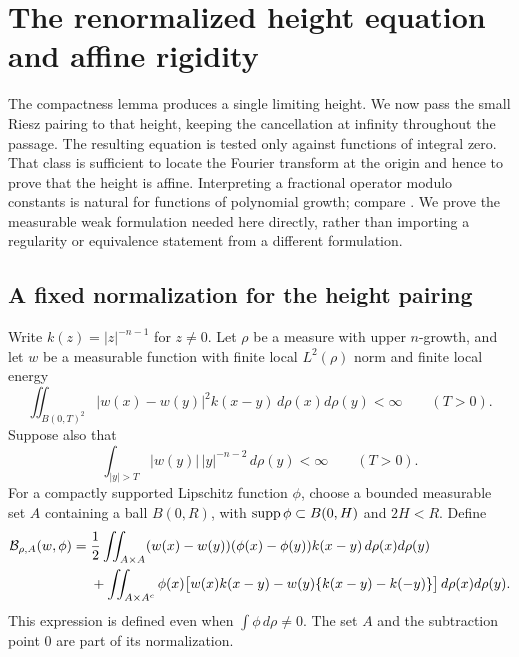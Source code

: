 \section[The height equation and affine rigidity]{The renormalized height equation and affine rigidity}
\label{sec:fractional-rigidity}

The compactness lemma produces a single limiting height.  We now pass the
small Riesz pairing to that height, keeping the cancellation at infinity
throughout the passage.  The resulting equation is tested only against
functions of integral zero.  That class is sufficient to locate the Fourier
transform at the origin and hence to prove that the height is affine.
Interpreting a fractional operator modulo constants is natural for
functions of polynomial growth; compare
\cite{DipierroSavinValdinoci2019}. We prove the measurable weak
formulation needed here directly, rather than importing a regularity
or equivalence statement from a different formulation.

\subsection{A fixed normalization for the height pairing}

Write $k(z)=|z|^{-n-1}$ for $z\ne0$.  Let $\rho$ be a measure with upper
$n$-growth, and let $w$ be a measurable function with finite local
$L^2(\rho)$ norm and finite local energy
\[
 \iint_{B(0,T)^2}|w(x)-w(y)|^2 k(x-y)\,d\rho(x)d\rho(y)<\infty
 \qquad(T>0).
\]
Suppose also that
\begin{equation}\label{eq:height-weighted-tail}
 \int_{|y|>T}|w(y)|\,|y|^{-n-2}\,d\rho(y)<\infty
 \qquad(T>0).
\end{equation}
For a compactly supported Lipschitz function $\phi$, choose a bounded
measurable set $A$ containing a ball $B(0,R)$, with
$\operatorname{supp}\phi\subset B(0,H)$ and $2H<R$.  Define
\begin{align}
 \mathcal B_{\rho,A}(w,\phi)
 ={}&\frac12\iint_{A\times A}
       (w(x)-w(y))(\phi(x)-\phi(y))k(x-y)\,d\rho(x)d\rho(y)
       \label{eq:normalized-height-pairing}\\
 &+\iint_{A\times A^c}\phi(x)
       \bigl[w(x)k(x-y)-w(y)\{k(x-y)-k(-y)\}\bigr]
       \,d\rho(x)d\rho(y).\notag
\end{align}
This expression is defined even when $\int\phi\,d\rho\ne0$.  The set $A$
and the subtraction point $0$ are part of its normalization.

